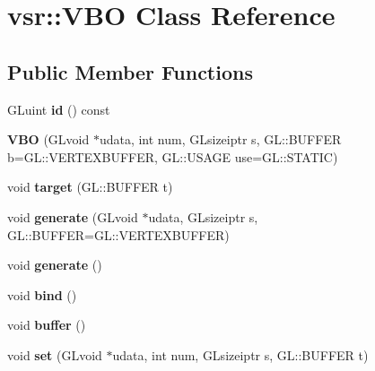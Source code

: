 \hypertarget{classvsr_1_1_v_b_o}{\section{vsr\-:\-:V\-B\-O Class Reference}
\label{classvsr_1_1_v_b_o}
}
\subsection*{Public Member Functions}
\begin{DoxyCompactItemize}
\item 
\hypertarget{classvsr_1_1_v_b_o_af555d488dba4b6618bc77c4a63e54c0f}{G\-Luint {\bfseries id} () const }\label{classvsr_1_1_v_b_o_af555d488dba4b6618bc77c4a63e54c0f}

\item 
\hypertarget{classvsr_1_1_v_b_o_aa77a28c58c9a3d12704e8fb51945bf20}{{\bfseries V\-B\-O} (G\-Lvoid $\ast$udata, int num, G\-Lsizeiptr s, G\-L\-::\-B\-U\-F\-F\-E\-R b=G\-L\-::\-V\-E\-R\-T\-E\-X\-B\-U\-F\-F\-E\-R, G\-L\-::\-U\-S\-A\-G\-E use=G\-L\-::\-S\-T\-A\-T\-I\-C)}\label{classvsr_1_1_v_b_o_aa77a28c58c9a3d12704e8fb51945bf20}

\item 
\hypertarget{classvsr_1_1_v_b_o_a5213a13f6f7652772a12e6099f2e84c4}{void {\bfseries target} (G\-L\-::\-B\-U\-F\-F\-E\-R t)}\label{classvsr_1_1_v_b_o_a5213a13f6f7652772a12e6099f2e84c4}

\item 
\hypertarget{classvsr_1_1_v_b_o_a8d55482f082ffcf45f195a0695e3c587}{void {\bfseries generate} (G\-Lvoid $\ast$udata, G\-Lsizeiptr s, G\-L\-::\-B\-U\-F\-F\-E\-R=G\-L\-::\-V\-E\-R\-T\-E\-X\-B\-U\-F\-F\-E\-R)}\label{classvsr_1_1_v_b_o_a8d55482f082ffcf45f195a0695e3c587}

\item 
\hypertarget{classvsr_1_1_v_b_o_a47c90d05ea5ac02c23db30e2dfa9789b}{void {\bfseries generate} ()}\label{classvsr_1_1_v_b_o_a47c90d05ea5ac02c23db30e2dfa9789b}

\item 
\hypertarget{classvsr_1_1_v_b_o_adae9ba7d2501b5754d6a0b20b5c0bd84}{void {\bfseries bind} ()}\label{classvsr_1_1_v_b_o_adae9ba7d2501b5754d6a0b20b5c0bd84}

\item 
\hypertarget{classvsr_1_1_v_b_o_a602e3d192b4efe0f86c91deb72f2fc16}{void {\bfseries buffer} ()}\label{classvsr_1_1_v_b_o_a602e3d192b4efe0f86c91deb72f2fc16}

\item 
\hypertarget{classvsr_1_1_v_b_o_a3afad30ab69c986668221478f26434a3}{void {\bfseries set} (G\-Lvoid $\ast$udata, int num, G\-Lsizeiptr s, G\-L\-::\-B\-U\-F\-F\-E\-R t)}\label{classvsr_1_1_v_b_o_a3afad30ab69c986668221478f26434a3}


\end{DoxyCompactItemize}
